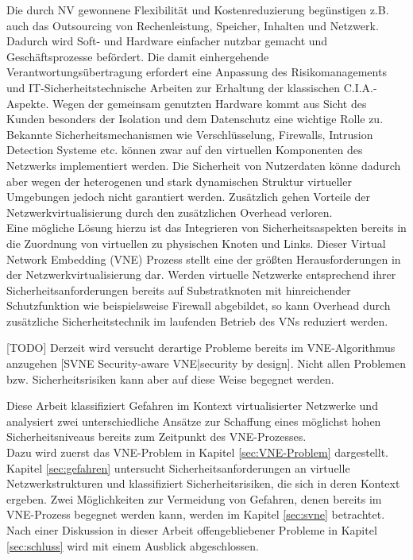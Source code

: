 Die durch NV gewonnene Flexibilität und Kostenreduzierung begünstigen z.B. auch das Outsourcing von Rechenleistung, Speicher, Inhalten und Netzwerk. Dadurch wird Soft- und Hardware einfacher nutzbar gemacht und Geschäftsprozesse befördert. Die damit einhergehende Verantwortungsübertragung erfordert eine Anpassung des Risikomanagements und IT-Sicherheitstechnische Arbeiten zur Erhaltung der klassischen C.I.A.-Aspekte. Wegen der gemeinsam genutzten Hardware kommt aus Sicht des Kunden besonders der Isolation und dem Datenschutz eine wichtige Rolle zu.\\
Bekannte Sicherheitsmechanismen wie Verschlüsselung, Firewalls, Intrusion Detection Systeme etc. können zwar auf den virtuellen Komponenten des Netzwerks implementiert werden. Die Sicherheit von Nutzerdaten könne dadurch aber wegen der heterogenen und stark dynamischen Struktur virtueller Umgebungen jedoch nicht garantiert werden. Zusätzlich gehen Vorteile der Netzwerkvirtualisierung durch den zusätzlichen Overhead verloren. \cite{gong2016virtual}\\
Eine mögliche Lösung hierzu ist das Integrieren von Sicherheitsaspekten bereits in die Zuordnung von virtuellen zu physischen Knoten und Links. Dieser Virtual Network Embedding (VNE) Prozess stellt eine der größten Herausforderungen in der Netzwerkvirtualisierung dar. \cite{fischer2013virtual}
Werden virtuelle Netzwerke entsprechend ihrer Sicherheitsanforderungen bereits auf Substratknoten mit hinreichender Schutzfunktion wie beispielsweise Firewall abgebildet, so kann Overhead durch zusätzliche Sicherheitstechnik im laufenden Betrieb des VNs reduziert werden.

[TODO]
Derzeit wird versucht \cite{bays2012security, gong2016virtual, wang2016towards} derartige Probleme bereits im VNE-Algorithmus anzugehen [SVNE Security-aware VNE|security by design]. Nicht allen Problemen bzw. Sicherheitsrisiken kann aber auf diese Weise begegnet werden. %


Diese Arbeit klassifiziert Gefahren im Kontext virtualisierter Netzwerke und analysiert zwei unterschiedliche Ansätze zur Schaffung eines möglichst hohen Sicherheitsniveaus bereits zum Zeitpunkt des VNE-Prozesses.\\
Dazu wird zuerst das VNE-Problem in Kapitel \ref{sec:VNE-Problem} dargestellt. Kapitel \ref{sec:gefahren} untersucht Sicherheitsanforderungen an virtuelle Netzwerkstrukturen und klassifiziert Sicherheitsrisiken, die sich in deren Kontext ergeben. Zwei Möglichkeiten zur Vermeidung von Gefahren, denen bereits im VNE-Prozess begegnet werden kann, werden im Kapitel \ref{sec:svne} betrachtet. Nach einer Diskussion in dieser Arbeit offengebliebener Probleme in Kapitel \ref{sec:schluss} wird mit einem Ausblick abgeschlossen.